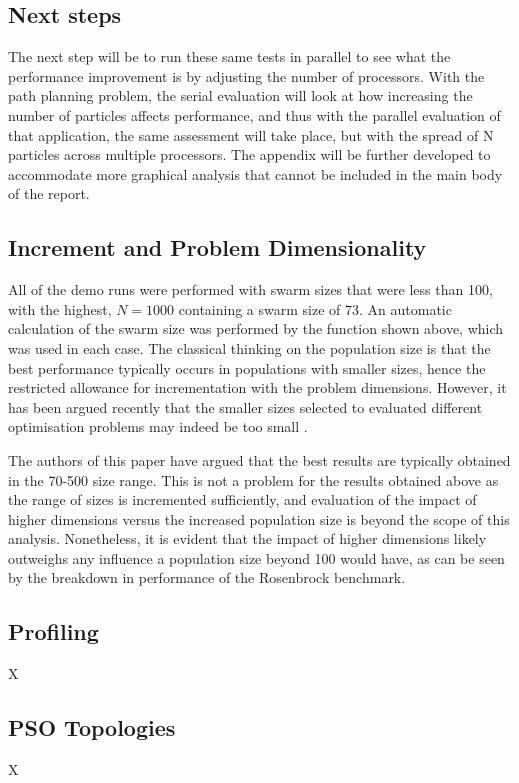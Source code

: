 \documentclass[KomodoMain.tex]{subfiles}
\begin{document}
\subsection{Next steps}

The next step will be to run these same tests in parallel to see what the performance improvement is by adjusting the number of processors. With the path planning problem, the serial evaluation will look at how increasing the number of particles affects performance, and thus with the parallel evaluation of that application, the same assessment will take place, but with the spread of N particles across multiple processors. The appendix will be further developed to accommodate more graphical analysis that cannot be included in the main body of the report.

\subsection{Increment and Problem Dimensionality}



All of the demo runs were performed with swarm sizes that were less than 100, with the highest, $N = 1000$ containing a swarm size of 73. An automatic calculation of the swarm size was performed by the function shown above, which was used in each case. The classical thinking on the population size is that the best performance typically occurs in populations with smaller sizes, hence the restricted allowance for incrementation with the problem dimensions. However, it has been argued recently that the smaller sizes selected to evaluated different optimisation problems may indeed be too small \cite{ssize}. 
\par
The authors of this paper have argued that the best results are typically obtained in the 70-500 size range. This is not a problem for the results obtained above as the range of sizes is incremented sufficiently, and evaluation of the impact of higher dimensions versus the increased population size is beyond the scope of this analysis. Nonetheless, it is evident that the impact of higher dimensions likely outweighs any influence a population size beyond 100 would have, as can be seen by the breakdown in performance of the Rosenbrock benchmark.


\subsection{Profiling}

X

\subsection{PSO Topologies}

X
\end{document}
